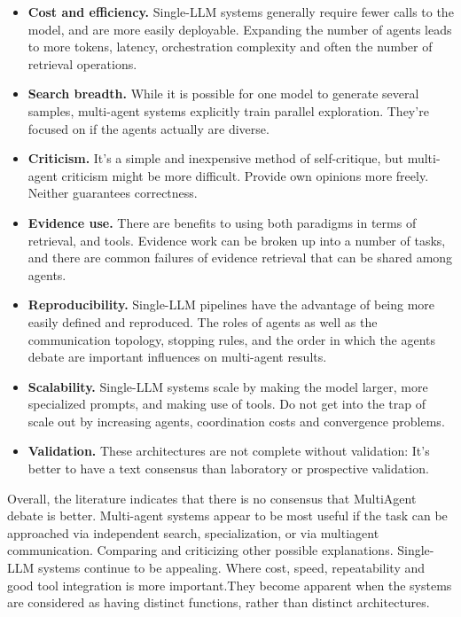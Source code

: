 \documentclass[acmsmall,screen,review]{acmart}
\begin{document}
\begin{itemize}
  \item \textbf{Cost and efficiency.} Single-LLM systems generally require fewer calls to the model, and are more easily deployable. Expanding the number of agents leads to more tokens, latency, orchestration complexity and often the number of retrieval operations.

  \item \textbf{Search breadth.} While it is possible for one model to generate several samples, multi-agent systems explicitly train parallel exploration. They're focused on if the agents actually are diverse.

  \item \textbf{Criticism.} It's a simple and inexpensive method of self-critique, but multi-agent criticism might be more difficult. Provide own opinions more freely. Neither guarantees correctness.

  \item \textbf{Evidence use.} There are benefits to using both paradigms in terms of retrieval, and tools. Evidence work can be broken up into a number of tasks, and there are common failures of evidence retrieval that can be shared among agents.

  \item \textbf{Reproducibility.} Single-LLM pipelines have the advantage of being more easily defined and reproduced. The roles of agents as well as the communication topology, stopping rules, and the order in which the agents debate are important influences on multi-agent results.

  \item \textbf{Scalability.} Single-LLM systems scale by making the model larger, more specialized prompts, and making use of tools. Do not get into the trap of scale out by increasing agents, coordination costs and convergence problems.

  \item \textbf{Validation.} These architectures are not complete without validation: It's better to have a text consensus than laboratory or prospective validation.

\end{itemize}

Overall, the literature indicates that there is no consensus that MultiAgent debate is better.
Multi-agent systems appear to be most useful if the task can be approached via independent search, specialization, or via multiagent communication.
Comparing and criticizing other possible explanations. Single-LLM systems continue to be appealing.
Where cost, speed, repeatability and good tool integration is more important.They become apparent when the systems are considered as having distinct functions, rather than distinct architectures.
\end{document}
